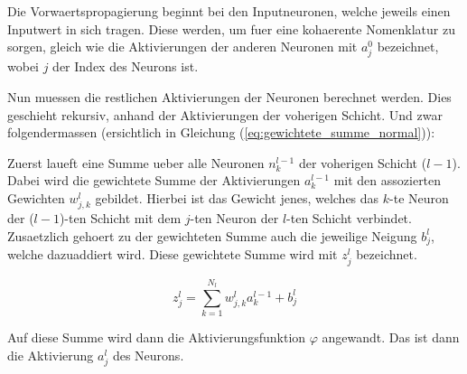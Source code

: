 \documentclass[../main]{subfiles}
\begin{document}
\par\bigskip
Die Vorwaertspropagierung beginnt bei den Inputneuronen, welche jeweils
einen Inputwert in sich tragen. Diese werden, um fuer eine kohaerente Nomenklatur zu sorgen,
gleich wie die Aktivierungen der anderen Neuronen mit $a_j^0$ bezeichnet, wobei
$j$ der Index des Neurons ist.\par
Nun muessen die restlichen Aktivierungen der Neuronen berechnet werden. Dies geschieht rekursiv, anhand der
Aktivierungen der voherigen Schicht. Und zwar folgendermassen (ersichtlich in
Gleichung (\ref{eq:gewichtete_summe_normal})):\par
Zuerst laueft eine Summe ueber alle Neuronen $n_k^{l-1}$ der voherigen Schicht
($l-1$). Dabei wird die gewichtete Summe der Aktivierungen $a_k^{l-1}$ mit den
assozierten Gewichten $w_{j,k}^l$ gebildet. Hierbei ist das Gewicht jenes, welches das
$k$-te Neuron der ($l-1$)-ten Schicht mit dem $j$-ten Neuron der $l$-ten Schicht verbindet.
Zusaetzlich gehoert zu der gewichteten Summe auch die jeweilige Neigung $b_j^l$, welche
dazuaddiert wird. Diese gewichtete Summe wird mit $z_j^l$ bezeichnet.

\begin{equation}\label{eq:gewichtete_summe_normal}
  z_j^l = \sum_{k=1}^{N_l} w_{j,k}^l a_k^{l-1} + b_j^l
\end{equation}

Auf diese Summe wird dann die Aktivierungsfunktion $\varphi$ angewandt.
Das ist dann die Aktivierung $a_j^l$ des Neurons.
\end{document}

